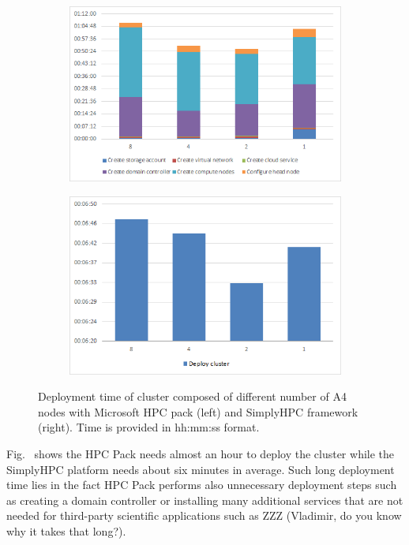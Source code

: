 \documentclass[3p,times]{elsarticle}
\begin{document}
\begin{figure}
\centering
\begin{subfigure}{.5\textwidth}
  \centering
			\includegraphics[width=\linewidth]{hpcDeployTime}	
  \label{fig:hpcgDeploy}
\end{subfigure}%
\begin{subfigure}{.5\textwidth}
  \centering
  \includegraphics[width=\linewidth]{simplyHpcDeployTime}
  \label{fig:simplyHpcDeploy}
\end{subfigure}
\caption{Deployment time of cluster composed of different number of A4 nodes with Microsoft HPC pack (left) and SimplyHPC framework (right). Time is provided in hh:mm:ss format.}
\label{fig:deployTime}
\end{figure}

Fig.~\label{fig:deployTime} shows the HPC Pack needs almost an hour to deploy the cluster while the SimplyHPC platform needs about six minutes in average. Such long deployment time lies in the fact HPC Pack performs also unnecessary deployment steps such as creating a domain controller or installing many additional services that are not needed for third-party scientific applications such as ZZZ (\textcolor[rgb]{1,0,0}{Vladimir, do you know why it takes that long?}).
\end{document}
